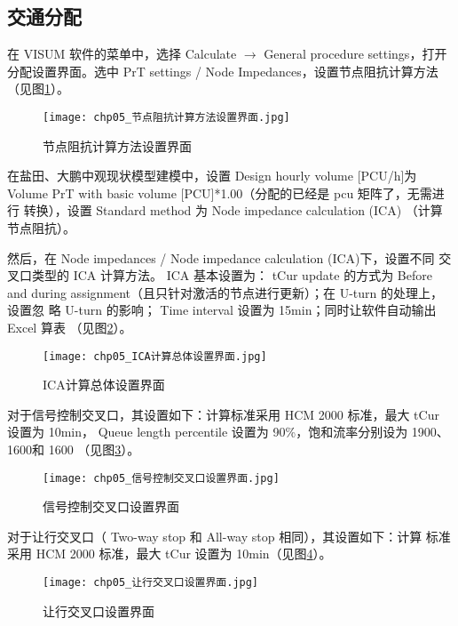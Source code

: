 \subsection{交通分配}

在 VISUM 软件的菜单中，选择 Calculate $\rightarrow$ General procedure settings，打开
分配设置界面。选中 PrT settings / Node Impedances，设置节点阻抗计算方法
（见图\ref{fig:chp05_节点阻抗计算方法设置界面}）。

\begin{figure}[!ht]
  \centering
  \texttt{[image: chp05\_节点阻抗计算方法设置界面.jpg]}
  \caption{节点阻抗计算方法设置界面\label{fig:chp05_节点阻抗计算方法设置界面} }
\end{figure}


在盐田、大鹏中观现状模型建模中，设置 Design hourly volume [PCU/h]为
Volume PrT with basic volume [PCU]*1.00（分配的已经是 pcu 矩阵了，无需进行
转换），设置 Standard method 为 Node impedance calculation (ICA) （计算节点阻抗）。

然后，在 Node impedances / Node impedance calculation (ICA)下，设置不同
交叉口类型的 ICA 计算方法。 ICA 基本设置为： tCur update 的方式为 Before and
during assignment（且只针对激活的节点进行更新）；在 U-turn 的处理上，设置忽
略 U-turn 的影响； Time interval 设置为 15min；同时让软件自动输出 Excel 算表
（见图\ref{fig:chp05_ICA计算总体设置界面}）。

\begin{figure}[!ht]
  \centering
  \texttt{[image: chp05\_ICA计算总体设置界面.jpg]}
  \caption{ICA计算总体设置界面\label{fig:chp05_ICA计算总体设置界面} }
\end{figure}

对于信号控制交叉口，其设置如下：计算标准采用 HCM 2000 标准，最大 tCur
设置为 10min， Queue length percentile 设置为 90\%，饱和流率分别设为 1900、1600和 1600
（见图\ref{fig:chp05_信号控制交叉口设置界面}）。

\begin{figure}[!ht]
  \centering
  \texttt{[image: chp05\_信号控制交叉口设置界面.jpg]}
  \caption{信号控制交叉口设置界面\label{fig:chp05_信号控制交叉口设置界面} }
\end{figure}

对于让行交叉口（ Two-way stop 和 All-way stop 相同），其设置如下：计算
标准采用 HCM 2000 标准，最大 tCur 设置为 10min（见图\ref{fig:chp05_让行交叉口设置界面}）。

\begin{figure}[!ht]
  \centering
  \texttt{[image: chp05\_让行交叉口设置界面.jpg]}
  \caption{让行交叉口设置界面\label{fig:chp05_让行交叉口设置界面} }
\end{figure}

